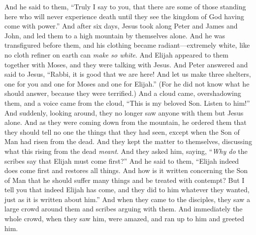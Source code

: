 \begin{biblechapter} %
\verse And he said to them, “Truly I say to you, that there are some of those standing here who will never experience death until they see the kingdom of God having come with power.”
 And after six days, Jesus took along Peter and James and John, and led them to a high mountain by themselves alone. And he was transfigured before them,
\verse and his clothing became radiant—extremely white, like no cloth refiner on earth can \textit{make so white}.
\verse And Elijah appeared to them together with Moses, and they were talking with Jesus.
\verse And Peter answered and said to Jesus, “Rabbi, it is good that we are here! And let us make three shelters, one for you and one for Moses and one for Elijah.”
\verse (For he did not know what he should answer, because they were terrified.)
\verse And a cloud came, overshadowing them, and a voice came from the cloud, “This is my beloved Son. Listen to him!”
\verse And suddenly, looking around, they no longer saw anyone with them but Jesus alone.
\verse And as they were coming down from the mountain, he ordered them that they should tell no one the things that they had seen, except when the Son of Man had risen from the dead.
\verse And they kept the matter to themselves, discussing what this rising from the dead \textit{meant}.
\verse And they asked him, saying, “\textit{Why do} the scribes say that Elijah must come first?”
\verse And he said to them, “Elijah indeed does come first and restores all things. And how is it written concerning the Son of Man that he should suffer many things and be treated with contempt?
\verse But I tell you that indeed Elijah has come, and they did to him whatever they wanted, just as it is written about him.”
 And when they came to the disciples, they saw a large crowd around them and scribes arguing with them.
\verse And immediately the whole crowd, when they saw him, were amazed, and ran up to him and greeted him.

\end{biblechapter}
